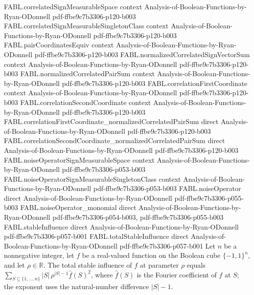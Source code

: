 \begin{theorem}
  {FABL.correlatedSignMeasurableSpace}
  {context}
  {Analysis-of-Boolean-Functions-by-Ryan-ODonnell}
  {pdf-ffbe9c7b3306-p120-b003}
\proofstep
  {FABL.correlatedSignMeasurableSingletonClass}
  {context}
  {Analysis-of-Boolean-Functions-by-Ryan-ODonnell}
  {pdf-ffbe9c7b3306-p120-b003}
\proofstep
  {FABL.pairCoordinatesEquiv}
  {context}
  {Analysis-of-Boolean-Functions-by-Ryan-ODonnell}
  {pdf-ffbe9c7b3306-p120-b003}
\proofstep
  {FABL.normalizedCorrelatedSignVectorSum}
  {context}
  {Analysis-of-Boolean-Functions-by-Ryan-ODonnell}
  {pdf-ffbe9c7b3306-p120-b003}
\proofstep
  {FABL.normalizedCorrelatedPairSum}
  {context}
  {Analysis-of-Boolean-Functions-by-Ryan-ODonnell}
  {pdf-ffbe9c7b3306-p120-b003}
\proofstep
  {FABL.correlationFirstCoordinate}
  {context}
  {Analysis-of-Boolean-Functions-by-Ryan-ODonnell}
  {pdf-ffbe9c7b3306-p120-b003}
\proofstep
  {FABL.correlationSecondCoordinate}
  {context}
  {Analysis-of-Boolean-Functions-by-Ryan-ODonnell}
  {pdf-ffbe9c7b3306-p120-b003}
\proofstep
  {FABL.correlationFirstCoordinate_normalizedCorrelatedPairSum}
  {direct}
  {Analysis-of-Boolean-Functions-by-Ryan-ODonnell}
  {pdf-ffbe9c7b3306-p120-b003}
\proofstep
  {FABL.correlationSecondCoordinate_normalizedCorrelatedPairSum}
  {direct}
  {Analysis-of-Boolean-Functions-by-Ryan-ODonnell}
  {pdf-ffbe9c7b3306-p120-b003}
\proofstep
  {FABL.noiseOperatorSignMeasurableSpace}
  {context}
  {Analysis-of-Boolean-Functions-by-Ryan-ODonnell}
  {pdf-ffbe9c7b3306-p053-b003}
\proofstep
  {FABL.noiseOperatorSignMeasurableSingletonClass}
  {context}
  {Analysis-of-Boolean-Functions-by-Ryan-ODonnell}
  {pdf-ffbe9c7b3306-p053-b003}
\proofstep
  {FABL.noiseOperator}
  {direct}
  {Analysis-of-Boolean-Functions-by-Ryan-ODonnell}
  {pdf-ffbe9c7b3306-p055-b003}
\proofstep
  {FABL.noiseOperator_monomial}
  {direct}
  {Analysis-of-Boolean-Functions-by-Ryan-ODonnell}
  {pdf-ffbe9c7b3306-p054-b003,
    pdf-ffbe9c7b3306-p055-b003}
\proofstep
  {FABL.stableInfluence}
  {direct}
  {Analysis-of-Boolean-Functions-by-Ryan-ODonnell}
  {pdf-ffbe9c7b3306-p057-b001}
\proofstep
  {FABL.totalStableInfluence}
  {direct}
  {Analysis-of-Boolean-Functions-by-Ryan-ODonnell}
  {pdf-ffbe9c7b3306-p057-b001}
Let $n$ be a nonnegative integer, let $f$ be a real-valued function on the Boolean cube
$\{-1,1\}^n$, and let $\rho\in\mathbb R$. The total stable influence of $f$ at
parameter $\rho$ equals $\sum_{S\subseteq\{1,\ldots,n\}}
|S|\,\rho^{|S|-1}\widehat f(S)^2$, where $\widehat f(S)$ is the Fourier coefficient
of $f$ at $S$; the exponent uses the natural-number difference $|S|-1$.
\end{theorem}

